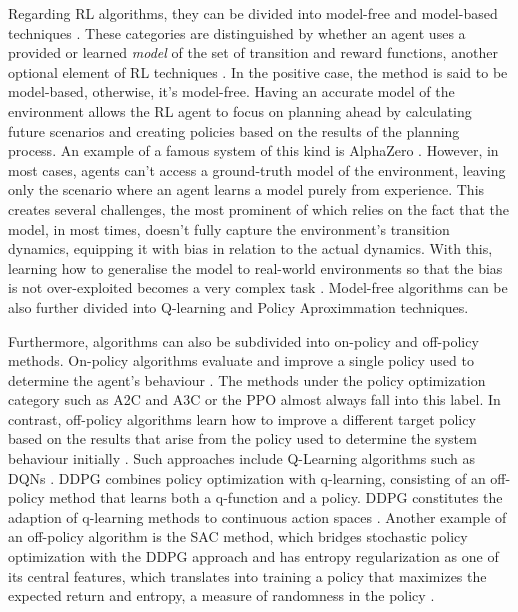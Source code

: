Regarding \ac{RL} algorithms, they can be divided into model-free and model-based techniques \cite{openaiSpinningDocumentation}. These categories are distinguished by whether an agent uses a provided or learned \textit{model} of the set of transition and reward functions, another optional element of \ac{RL} techniques \cite{moralesGrokkingDeepReinforcement2020, openaiSpinningDocumentation}. In the positive case, the method is said to be model-based, otherwise, it's model-free. Having an accurate model of the environment allows the \ac{RL} agent to focus on planning ahead by calculating future scenarios and creating policies based on the results of the planning process. An example of a famous system of this kind is AlphaZero \cite{silverMasteringChessShogi2017}. However, in most cases, agents can't access a ground-truth model of the environment, leaving only the scenario where an agent learns a model purely from experience. This creates several challenges, the most prominent of which relies on the fact that the model, in most times, doesn't fully capture the environment's transition dynamics, equipping it with bias in relation to the actual dynamics. With this, learning how to generalise the model to real-world environments so that the bias is not over-exploited becomes a very complex task \cite{openaiSpinningDocumentation}.  Model-free algorithms can be also further divided into Q-learning and Policy Aproximmation techniques. \par
Furthermore, algorithms can also be subdivided into on-policy and off-policy methods. \cite{moralesGrokkingDeepReinforcement2020} On-policy algorithms evaluate and improve a single policy used to determine the agent's behaviour \cite{moralesGrokkingDeepReinforcement2020}. The methods under the policy optimization category such as A2C and A3C \cite{mnihAsynchronousMethodsDeep2016} or the \ac{PPO} \cite{schulmanProximalPolicyOptimization2017} almost always fall into this label. In contrast, off-policy algorithms learn how to improve a different target policy based on the results that arise from the policy used to determine the system behaviour initially \cite{moralesGrokkingDeepReinforcement2020}. Such approaches include Q-Learning algorithms such as \acp{DQN} \cite{mnihHumanlevelControlDeep2015, openaiSpinningDocumentation}. \ac{DDPG} \cite{lillicrapContinuousControlDeep2019} combines policy optimization with q-learning, consisting of an off-policy method that learns both a q-function and a policy. \ac{DDPG} constitutes the adaption of q-learning methods to continuous action spaces \cite{openaiSpinningDocumentation}. Another example of an off-policy algorithm is the \ac{SAC} \cite{haarnojaSoftActorCriticOffPolicy2018} method, which bridges stochastic policy optimization with the \ac{DDPG} approach and has entropy regularization as one of its central features, which translates into training a policy that maximizes the expected return and entropy, a measure of randomness in the policy \cite{openaiSpinningDocumentation}. \par
